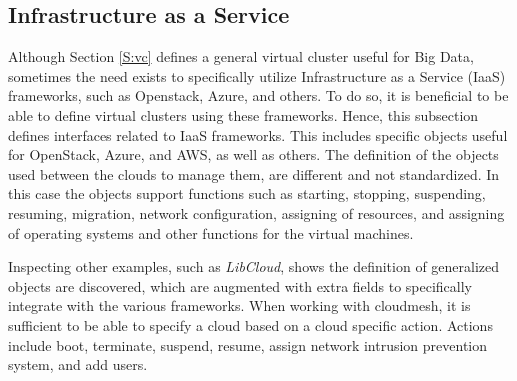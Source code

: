 \documentclass[10pt]{article}
\begin{document}








\subsection{Infrastructure as a Service}

Although Section \ref{S:vc} defines a general virtual
cluster useful for Big Data, sometimes the need exists to
specifically utilize Infrastructure as a Service (IaaS) frameworks, such as
Openstack, Azure, and others. To do so, it is beneficial to
be able to define virtual clusters using these frameworks. Hence, 
this subsection defines interfaces related to 
IaaS frameworks. This includes specific objects useful for
OpenStack, Azure, and AWS, as well as others. The definition of the
objects used between the clouds to manage them, are different and not
standardized. In this case the objects support functions such as
starting, stopping, suspending, resuming, migration, network
configuration, assigning of resources, and assigning of operating systems
and other functions for the virtual machines.

Inspecting other examples, such as {\it LibCloud}, shows the definition of
generalized objects are discovered, which are augmented with extra fields to
specifically integrate with the various frameworks. When working with
cloudmesh, it is sufficient to be able to specify a
cloud based on a cloud specific action. Actions include boot,
terminate, suspend, resume, assign network intrusion prevention system, and add users.
\end{document}
